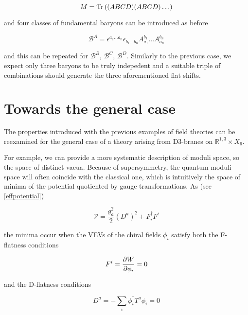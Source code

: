 \begin{equation}
	M = \operatorname{Tr} \left( (ABCD)(ABCD) \ldots \right)
	\label{}
\end{equation}

and four classes of fundamental baryons can be introduced as before

\begin{equation}
	\mathcal{B}^A = \epsilon^{a_1\ldots a_n}\epsilon_{b_1 \ldots b_n} A^{b_1}_{a_1} \ldots A^{b_n}_{a_n}
	\label{}
\end{equation}

and this can be repeated for $\mathcal{B}^B$, $\mathcal{B}^C$, $\mathcal{B}^D$. Similarly to the previous case, we expect only three baryons to be truly indepedent and a suitable triple of combinations should generate the three aforementioned flat shifts.





\section{Towards the general case}

The properties introduced with the previous examples of field theories can be reexamined for the general case of a theory arising from D3-branes on $\mathbb{R}^{1,3} \times X_6$.

For example, we can provide a more systematic description of moduli space, so the space of distinct vacua. Because of supersymmetry, the quantum moduli space will often coincide with the classical one, which is intuitively the space of minima of the potential quotiented by gauge transformations. As (see \eqref{effpotential})

\begin{equation}
	\mathcal{V} = \frac{g_a^2}{2} (D^a)^2 + F^\dagger_i F^i
	\label{}
\end{equation}

the minima occur when the VEVs of the chiral fields $\phi_i$ satisfy both the F-flatness conditions

\begin{equation}
	F^i = \frac{\partial W}{\partial\phi_i} = 0
	\label{}
\end{equation}

and the D-flatness conditions

\begin{equation}
	D^a = - \sum_i \phi_i^\dagger T^a \phi_i = 0
\end{equation}

